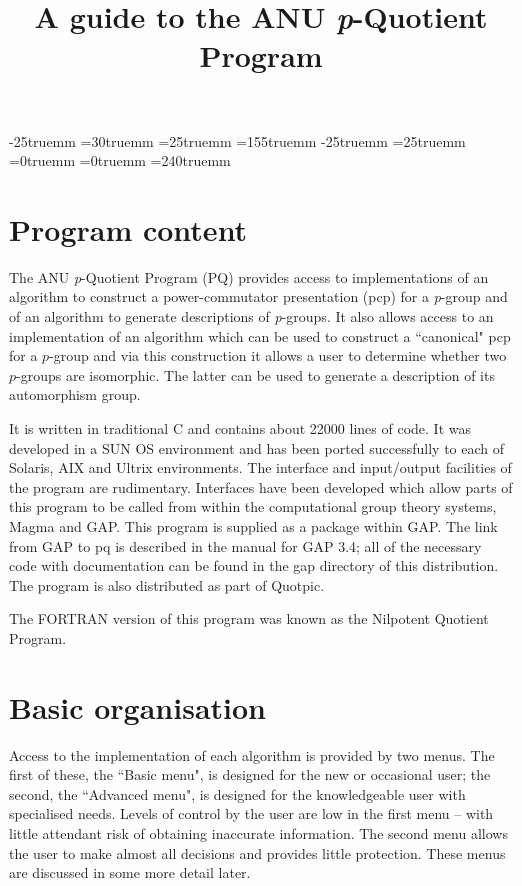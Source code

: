 %
%
\hoffset -25truemm                 
\oddsidemargin=30truemm             %
\evensidemargin=25truemm            %
\textwidth=155truemm                %
\voffset -25truemm                  
\topmargin=25truemm                 %
\headheight=0truemm                 %
\headsep=0truemm                    %
\textheight=240truemm               %
%
\def\pq{the $p$-quotient implementation}

\title{A guide to the ANU {\it p}-Quotient Program}
\author{}
\date{}
\maketitle

\section{Program content}
The ANU {\it p}-Quotient Program (PQ) provides access to implementations 
of an algorithm to construct a power-commutator presentation (pcp) for 
a {\it p}-group and of an algorithm to generate descriptions of 
{\it p}-groups.  It also allows access to an implementation
of an algorithm which can be used to construct a ``canonical" 
pcp for a $p$-group and via this construction it allows a user 
to determine whether two $p$-groups are isomorphic. The latter
can be used to generate a description of its automorphism group.

It is written in traditional C and contains about 22000 lines of code.
It was developed in a SUN OS environment and has been ported successfully
to each of Solaris, AIX and Ultrix environments.  The interface and 
input/output facilities of the program are rudimentary.  Interfaces 
have been developed which allow parts of this program to be called
from within the computational group theory systems, 
{\sc Magma} and {\sf GAP}.  
This program is supplied as a package within {\sf GAP}.
The link from {\sf GAP} to pq is described in the manual
for {\sf GAP} 3.4; all of the necessary 
code with documentation 
can be found in the gap directory of this distribution.
The program is also distributed as part of Quotpic.

The FORTRAN version of this program was known as the 
Nilpotent Quotient Program.
\section{Basic organisation}
Access to the implementation of each algorithm is provided by two menus. 
The first of these, the ``Basic menu", is designed for the new or 
occasional user; the second, the ``Advanced menu", is designed for 
the knowledgeable user with specialised needs.
Levels of control by the user are low in the first menu -- with little
attendant risk of obtaining inaccurate information. The second menu 
allows the user to make almost all decisions and provides little protection.
These menus are discussed in some more detail later. 


